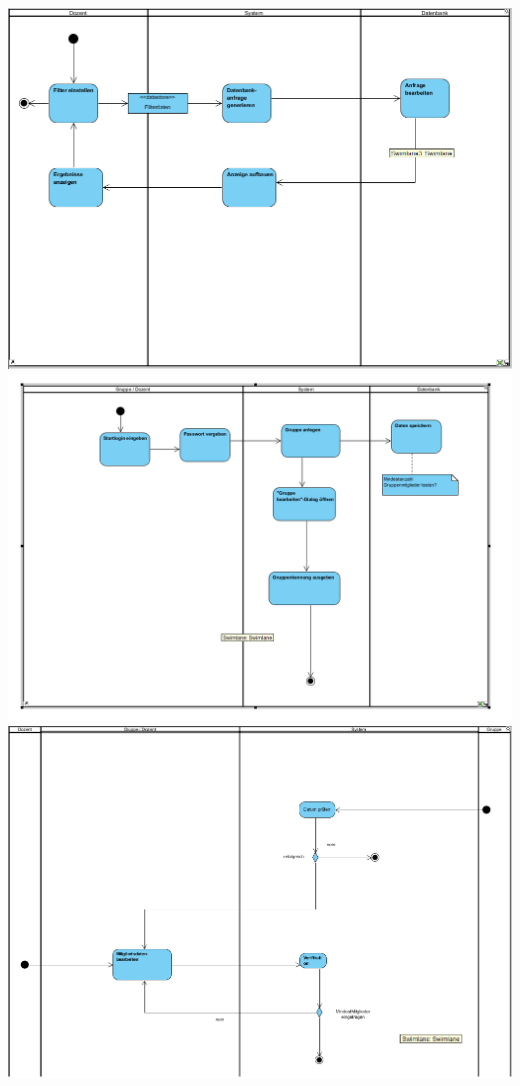 \documentclass{article}
\begin{document}
\begin{center}
\includegraphics[scale=1]{bilder/Email_Adressen_anzeigen_Activity.png}\\
\includegraphics[scale=1]{bilder/Gruppe_erstellen_Activity.png}\\
\includegraphics[scale=1]{bilder/Gruppe_bearbeiten_Activity.png}\\
\end{center}
\end{document}

